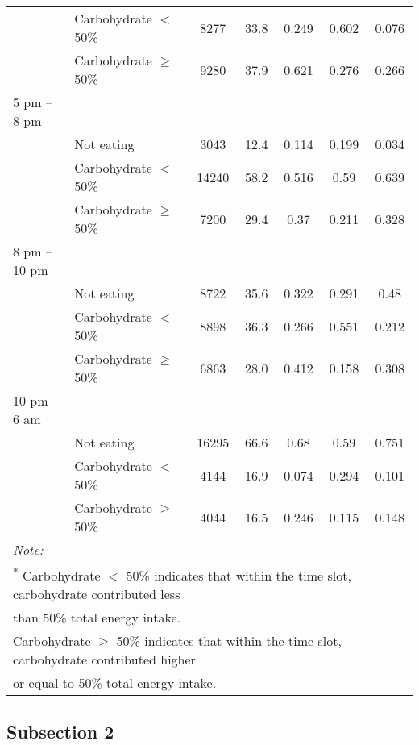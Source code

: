 \begin{table}
\begin{tabular}[t]{llccccc}
		& Carbohydrate $<$ 50\% & 8277 & 33.8 & 0.249 & 0.602 & 0.076\\
		& Carbohydrate $\geqslant$ 50\% & 9280 & 37.9 & 0.621 & 0.276 & 0.266\\
		5 pm – 8 pm &  &  &  &  &  & \\
		& Not eating & 3043 & 12.4 & 0.114 & 0.199 & 0.034\\
		& Carbohydrate $<$ 50\% & 14240 & 58.2 & 0.516 & 0.59 & 0.639\\
		& Carbohydrate $\geqslant$ 50\% & 7200 & 29.4 & 0.37 & 0.211 & 0.328\\
		8 pm – 10 pm &  &  &  &  &  & \\
		& Not eating & 8722 & 35.6 & 0.322 & 0.291 & 0.48\\
		& Carbohydrate $<$ 50\% & 8898 & 36.3 & 0.266 & 0.551 & 0.212\\
		& Carbohydrate $\geqslant$ 50\% & 6863 & 28.0 & 0.412 & 0.158 & 0.308\\
		10 pm – 6 am &  &  &  &  &  & \\
		& Not eating & 16295 & 66.6 & 0.68 & 0.59 & 0.751\\
		& Carbohydrate $<$ 50\% & 4144 & 16.9 & 0.074 & 0.294 & 0.101\\
		& Carbohydrate $\geqslant$ 50\% & 4044 & 16.5 & 0.246 & 0.115 & 0.148\\
		\bottomrule
		\multicolumn{7}{l}{\textit{Note: }}\\
		\multicolumn{7}{l}{\textsuperscript{*} Carbohydrate $<$ 50\% indicates that within the time slot, carbohydrate contributed less }\\
		\multicolumn{7}{l}{than 50\% total energy intake.}\\ 
		\multicolumn{7}{l}{\textsuperscript{\dag} Carbohydrate $\geqslant$ 50\% indicates that within the time slot, carbohydrate contributed higher }\\
		\multicolumn{7}{l}{or equal to 50\% total energy intake.}\\ 
	\end{tabular}
\end{table}



\subsection{Subsection 2}

